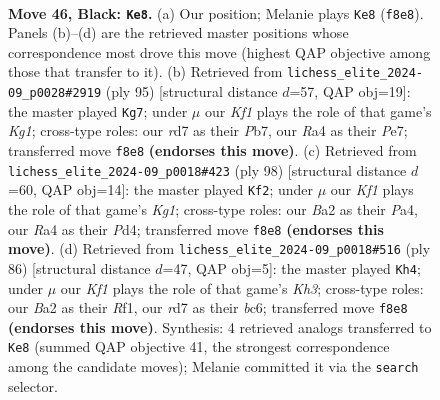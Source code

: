 \documentclass[11pt]{article}
\begin{document}
\clearpage

\begin{figure}[p]\centering
\begin{subfigure}{0.46\textwidth}\centering
\resizebox{\linewidth}{!}{%
\newchessgame
\chessboard[
  setfen={5k2/3R4/2r5/1p2B1p1/rn6/4P1PP/b3RP2/6K1 b - - 2 46},
  showmover=false,
  pgfstyle=straightmove, color=movearrow, markmove={f8-e8}
]}
\caption{}
\end{subfigure}\hfill
\begin{subfigure}{0.46\textwidth}\centering
\resizebox{\linewidth}{!}{%
\newchessgame
\chessboard[
  setfen={6k1/1p2p3/5nB1/1P1Pp3/7P/1r2b1P1/2R3K1/3R4 b - - 2 48},
  showmover=false,
  pgfstyle=straightmove, color=movearrow, markmove={g8-g7}
]}
\caption{}
\end{subfigure}
\\[4pt]
\begin{subfigure}{0.46\textwidth}\centering
\resizebox{\linewidth}{!}{%
\newchessgame
\chessboard[
  setfen={2b2k2/r5p1/2p2p2/2Np4/P2P4/4RP2/8/6K1 w - - 0 50},
  showmover=false,
  pgfstyle=straightmove, color=movearrow, markmove={g1-f2}
]}
\caption{}
\end{subfigure}\hfill
\begin{subfigure}{0.46\textwidth}\centering
\resizebox{\linewidth}{!}{%
\newchessgame
\chessboard[
  setfen={8/p5k1/1pb3p1/2p3N1/2Pb1P2/1r5K/8/4RR2 w - - 11 44},
  showmover=false,
  pgfstyle=straightmove, color=movearrow, markmove={h3-h4}
]}
\caption{}
\end{subfigure}
\caption{\textbf{Move 46, Black: \texttt{Ke8}.} (a) Our position; Melanie plays \texttt{Ke8} (\texttt{f8e8}). Panels (b)--(d) are the retrieved master positions whose correspondence most drove this move (highest QAP objective among those that transfer to it). (b) Retrieved from \texttt{lichess\_elite\_2024-09\_p0028\#2919} (ply 95) [structural distance $d$=57, QAP obj=19]: the master played \texttt{Kg7}; under $\mu$ our \emph{Kf1} plays the role of that game's \emph{Kg1}; cross-type roles: our \emph{r}d7 as their \emph{P}b7, our \emph{R}a4 as their \emph{P}e7; transferred move \texttt{f8e8} \textbf{(endorses this move)}. (c) Retrieved from \texttt{lichess\_elite\_2024-09\_p0018\#423} (ply 98) [structural distance $d$=60, QAP obj=14]: the master played \texttt{Kf2}; under $\mu$ our \emph{Kf1} plays the role of that game's \emph{Kg1}; cross-type roles: our \emph{B}a2 as their \emph{P}a4, our \emph{R}a4 as their \emph{P}d4; transferred move \texttt{f8e8} \textbf{(endorses this move)}. (d) Retrieved from \texttt{lichess\_elite\_2024-09\_p0018\#516} (ply 86) [structural distance $d$=47, QAP obj=5]: the master played \texttt{Kh4}; under $\mu$ our \emph{Kf1} plays the role of that game's \emph{Kh3}; cross-type roles: our \emph{B}a2 as their \emph{R}f1, our \emph{r}d7 as their \emph{b}c6; transferred move \texttt{f8e8} \textbf{(endorses this move)}. Synthesis: 4 retrieved analogs transferred to \texttt{Ke8} (summed QAP objective 41, the strongest correspondence among the candidate moves); Melanie committed it via the \texttt{search} selector.}
\label{fig:thought-m91}
\end{figure}
\end{document}
